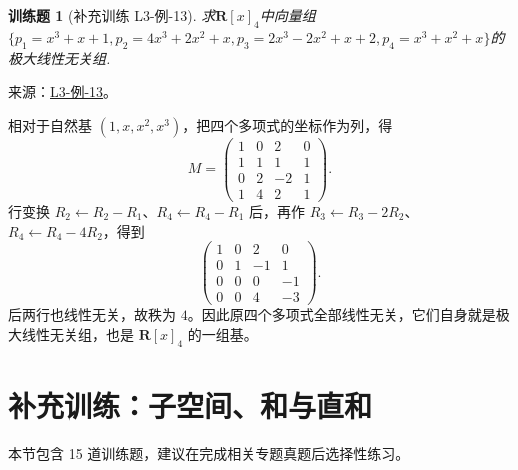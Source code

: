 \documentclass[UTF8,12pt,a4paper,fontset=fandol]{ctexart}
\newtheorem{exercise}{训练题}[section]
\begin{document}
\begin{exercise}[补充训练 L3-例-13]\label{prob:L3-例-13}
求$\mathbf{R}[x]_4$中向量组$\{p_1=x^3+x+1,p_2=4x^3+2x^2+x,p_3=2x^3-2x^2+x+2,p_4=x^3+x^2+x\}$的极大线性无关组.
\end{exercise}
\noindent 来源：\href{https://github.com/yhwu-is/Linear-Algebra-Left-Undone/blob/new/%E8%AE%B2%E4%B9%89/%E4%B8%93%E9%A2%98/3%20%E6%9C%89%E9%99%90%E7%BB%B4%E7%BA%BF%E6%80%A7%E7%A9%BA%E9%97%B4.tex}{L3-例-13}。
\begin{solve}
相对于自然基 $(1,x,x^2,x^3)$，把四个多项式的坐标作为列，得
\[M=\begin{pmatrix}1&0&2&0\\1&1&1&1\\0&2&-2&1\\1&4&2&1\end{pmatrix}.\]
行变换 $R_2\leftarrow R_2-R_1$、$R_4\leftarrow R_4-R_1$ 后，再作 $R_3\leftarrow R_3-2R_2$、$R_4\leftarrow R_4-4R_2$，得到
\[\begin{pmatrix}1&0&2&0\\0&1&-1&1\\0&0&0&-1\\0&0&4&-3\end{pmatrix}.\]
后两行也线性无关，故秩为 $4$。因此原四个多项式全部线性无关，它们自身就是极大线性无关组，也是 $\mathbf R[x]_4$ 的一组基。
\end{solve}

\section{补充训练：子空间、和与直和}

本节包含 15 道训练题，建议在完成相关专题真题后选择性练习。
\end{document}
